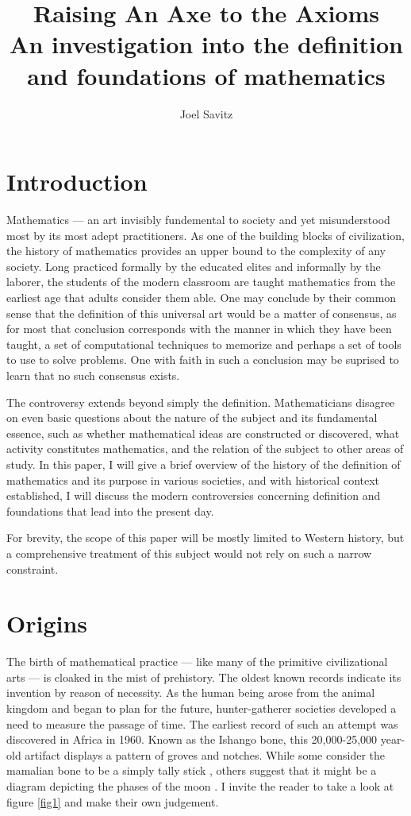 \documentclass[12pt]{article}
\title{Raising An Axe to the Axioms \\ \small An investigation into the definition and foundations of mathematics}
\author{Joel Savitz}
\begin{document}
\maketitle


\section{Introduction}

Mathematics ---
an art invisibly fundemental to society
and yet misunderstood most by its most adept practitioners.
As one of the building blocks of civilization,
the history of mathematics provides an upper bound
to the complexity of any society.
Long practiced formally by the educated elites
and informally by the laborer,
the students of the modern classroom
are taught mathematics from the earliest age
that adults consider them able.
One may conclude by their common sense
that the definition of this universal art
would be a matter of consensus,
as for most that conclusion corresponds
with the manner in which they have been taught,
a set of computational techniques to memorize and
perhaps a set of tools to use to solve problems.
One with faith in such a conclusion
may be suprised to learn that
no such consensus exists.

The controversy extends
beyond simply the definition.
Mathematicians disagree on even
basic questions
about the nature of the subject
and its fundamental essence,
such as whether mathematical ideas
are constructed or discovered,
what activity constitutes mathematics,
and the relation of the subject
to other areas of study.
In this paper,
I will give a brief overview
of the history of the definition of mathematics
and its purpose in various societies,
and with historical context established,
I will discuss the modern controversies
concerning definition and foundations
that lead into the present day.

For brevity, the scope of this paper
will be mostly limited
to Western history,
but a comprehensive treatment of this subject
would not rely on such a narrow constraint.

\section{Origins}

The birth of mathematical practice
--- like many of the primitive civilizational arts ---
is cloaked in the mist of prehistory.
The oldest known records indicate its
invention by reason of necessity.
As the human being arose from the animal kingdom
and began to plan for the future,
hunter-gatherer societies developed
a need to measure the passage of time.
The earliest record of such an attempt
was discovered in Africa in 1960.
Known as the Ishango bone,
this 20,000-25,000 year-old artifact
displays a pattern of groves and notches.
While some consider the mamalian bone
to be a simply tally stick \cite{ishango},
others suggest that it might be a diagram
depicting the phases of the moon \cite{ishango2}.
I invite the reader to take a look at figure \ref{fig1}
and make their own judgement.
\end{document}
